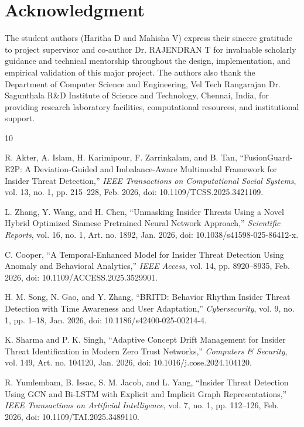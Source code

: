 \documentclass[conference]{IEEEtran}
\begin{document}
\section*{Acknowledgment}
The student authors (Haritha D and Mahisha V) express their sincere gratitude to project supervisor and co-author Dr. RAJENDRAN T for invaluable scholarly guidance and technical mentorship throughout the design, implementation, and empirical validation of this major project. The authors also thank the Department of Computer Science and Engineering, Vel Tech Rangarajan Dr. Sagunthala R\&D Institute of Science and Technology, Chennai, India, for providing research laboratory facilities, computational resources, and institutional support.

\vfill\break

\begin{thebibliography}{10}

 R. Akter, A. Islam, H. Karimipour, F. Zarrinkalam, and B. Tan, ``FusionGuard-E2P: A Deviation-Guided and Imbalance-Aware Multimodal Framework for Insider Threat Detection,'' \textit{IEEE Transactions on Computational Social Systems}, vol. 13, no. 1, pp. 215--228, Feb. 2026, doi: 10.1109/TCSS.2025.3421109.

 L. Zhang, Y. Wang, and H. Chen, ``Unmasking Insider Threats Using a Novel Hybrid Optimized Siamese Pretrained Neural Network Approach,'' \textit{Scientific Reports}, vol. 16, no. 1, Art. no. 1892, Jan. 2026, doi: 10.1038/s41598-025-86412-x.

 C. Cooper, ``A Temporal-Enhanced Model for Insider Threat Detection Using Anomaly and Behavioral Analytics,'' \textit{IEEE Access}, vol. 14, pp. 8920--8935, Feb. 2026, doi: 10.1109/ACCESS.2025.3529901.

 H. M. Song, N. Gao, and Y. Zhang, ``BRITD: Behavior Rhythm Insider Threat Detection with Time Awareness and User Adaptation,'' \textit{Cybersecurity}, vol. 9, no. 1, pp. 1--18, Jan. 2026, doi: 10.1186/s42400-025-00214-4.

 K. Sharma and P. K. Singh, ``Adaptive Concept Drift Management for Insider Threat Identification in Modern Zero Trust Networks,'' \textit{Computers \& Security}, vol. 149, Art. no. 104120, Jan. 2026, doi: 10.1016/j.cose.2024.104120.

 R. Yumlembam, B. Issac, S. M. Jacob, and L. Yang, ``Insider Threat Detection Using GCN and Bi-LSTM with Explicit and Implicit Graph Representations,'' \textit{IEEE Transactions on Artificial Intelligence}, vol. 7, no. 1, pp. 112--126, Feb. 2026, doi: 10.1109/TAI.2025.3489110.


\end{thebibliography}
\end{document}
